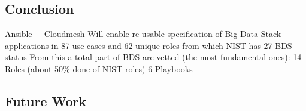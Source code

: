 
\subsection{Conclusion}
Ansible + Cloudmesh
Will enable re-usable specification of Big Data Stack applications in 87 use cases and 62 unique roles from which NIST has 27
BDS status
From this a total part of BDS are vetted (the most fundamental ones): 
14 Roles  (about 50\% done of NIST roles)
6   Playbooks



\subsection{Future Work}



